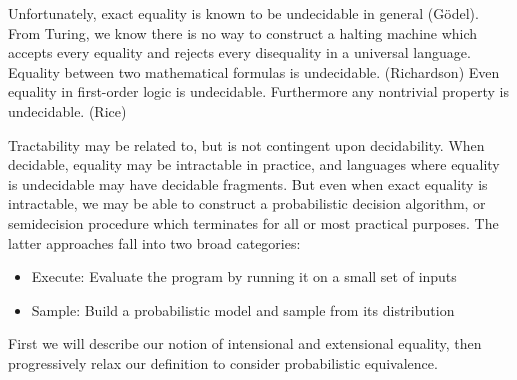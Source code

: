 \documentclass[11pt]{article}
\begin{document}
    Unfortunately, exact equality is known to be undecidable in general (G\"odel). From Turing, we know there is no way to construct a halting machine which accepts every equality and rejects every disequality in a universal language. Equality between two mathematical formulas is undecidable. (Richardson) Even equality in first-order logic is undecidable. Furthermore any nontrivial property is undecidable. (Rice)


    Tractability may be related to, but is not contingent upon decidability. When decidable, equality may be intractable in practice, and languages where equality is undecidable may have decidable fragments. But even when exact equality is intractable, we may be able to construct a probabilistic decision algorithm, or semidecision procedure which terminates for all or most practical purposes. The latter approaches fall into two broad categories:

    \begin{itemize}
        \item Execute: Evaluate the program by running it on a small set of inputs
        \item Sample: Build a probabilistic model and sample from its distribution
    \end{itemize}

    First we will describe our notion of intensional and extensional equality, then progressively relax our definition to consider probabilistic equivalence.


%



\end{document}
